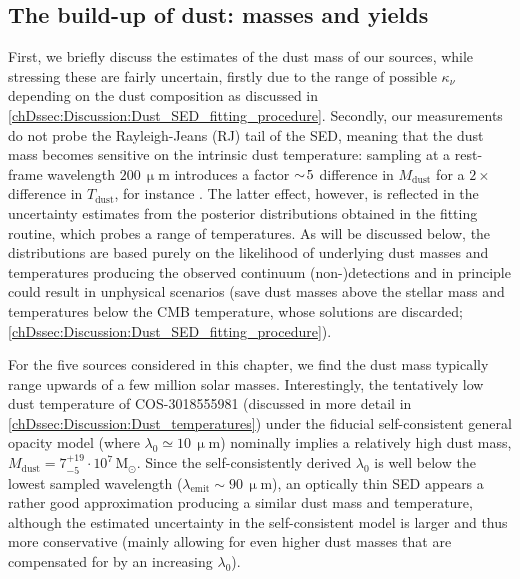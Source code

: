 \begin{figure}
{    }
    \label{chDfig:L_IR_constraints}
\end{figure}

\subsection{The build-up of dust: masses and yields}
\label{chDssec:Discussion:Dust_masses}

First, we briefly discuss the estimates of the dust mass of our sources, while stressing these are fairly uncertain, firstly due to the range of possible $\kappa_\nu$ depending on the dust composition as discussed in \cref{chDssec:Discussion:Dust_SED_fitting_procedure}. Secondly, our measurements do not probe the Rayleigh-Jeans (RJ) tail of the SED, meaning that the dust mass becomes sensitive on the intrinsic dust temperature: sampling at a rest-frame wavelength $200 \, \mathrm{\upmu m}$ introduces a factor $\sim \! 5$ difference in $M_\text{dust}$ for a $2 \times$ difference in $T_\text{dust}$, for instance \citep{2020A&A...634L..14C}. The latter effect, however, is reflected in the uncertainty estimates from the posterior distributions obtained in the  fitting routine, which probes a range of temperatures. As will be discussed below, the distributions are based purely on the likelihood of underlying dust masses and temperatures producing the observed continuum (non-)detections and in principle could result in unphysical scenarios (save dust masses above the stellar mass and temperatures below the CMB temperature, whose solutions are discarded; \cref{chDssec:Discussion:Dust_SED_fitting_procedure}).

For the five sources considered in this chapter, we find the dust mass typically range upwards of a few million solar masses. Interestingly, the tentatively low dust temperature of COS-3018555981 (discussed in more detail in \cref{chDssec:Discussion:Dust_temperatures}) under the fiducial self-consistent general opacity model (where $\lambda_0 \simeq 10 \, \mathrm{\upmu m}$) nominally implies a relatively high dust mass, $M_\text{dust} = 7_{-5}^{+19} \cdot 10^7 \, \mathrm{M_\odot}$. Since the self-consistently derived $\lambda_0$ is well below the lowest sampled wavelength ($\lambda_\text{emit} \sim 90 \, \mathrm{\upmu m}$), an optically thin SED appears a rather good approximation producing a similar dust mass and temperature, although the estimated uncertainty in the self-consistent model is larger and thus more conservative (mainly allowing for even higher dust masses that are compensated for by an increasing $\lambda_0$).

